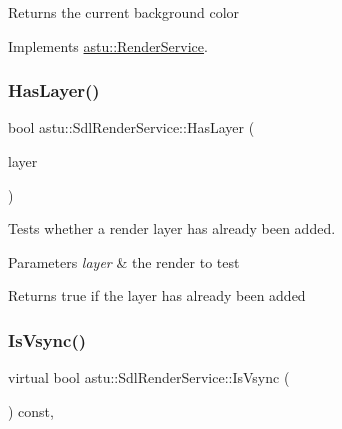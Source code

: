\begin{DoxyReturn}{Returns}
the current background color 
\end{DoxyReturn}


Implements \hyperlink{classastu_1_1RenderService_a5491abad694b7d662f67b4d4bc858e87}{astu\+::\+Render\+Service}.

\mbox{\label{classastu_1_1SdlRenderService_afe973840da86bd8cdf1b703cdd642529}} 
\subsubsection{\texorpdfstring{Has\+Layer()}{HasLayer()}}
{\footnotesize\ttfamily bool astu\+::\+Sdl\+Render\+Service\+::\+Has\+Layer (\begin{DoxyParamCaption}\item[{\hyperlink{classastu_1_1ISdlRenderLayer}{I\+Sdl\+Render\+Layer} \&}]{layer }\end{DoxyParamCaption})}

Tests whether a render layer has already been added.


\begin{DoxyParams}{Parameters}
{\em layer} & the render to test \\
\hline
\end{DoxyParams}
\begin{DoxyReturn}{Returns}
{\ttfamily true} if the layer has already been added 
\end{DoxyReturn}
\mbox{\label{classastu_1_1SdlRenderService_a3bcc49339bca8cd388c16caefb18cadf}} 
\subsubsection{\texorpdfstring{Is\+Vsync()}{IsVsync()}}
{\footnotesize\ttfamily virtual bool astu\+::\+Sdl\+Render\+Service\+::\+Is\+Vsync (\begin{DoxyParamCaption}{ }\end{DoxyParamCaption}) const\hspace{0.3cm}{\ttfamily [override]}, {\ttfamily [virtual]}}


